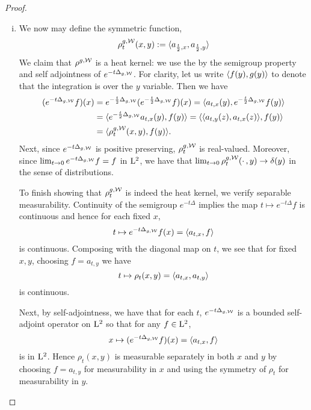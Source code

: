 \documentclass[a4paper, 12pt]{amsart}
\begin{document}
\begin{proof}
\begin{enumerate}[(i)]
\item We now may define the symmetric function,
  $$\rho^{g,\mathcal{W}}_t(x,y) := \langle a_{\frac{t}{2}, x}, a_{\frac{t}{2}, y} \rangle$$
        We claim that \(\rho^{g,\mathcal{W}}\) is a heat kernel: we use the by the semigroup property and self adjointness of \(e^{-t\Delta_{g,\mathcal{W}}}\). For clarity, let us write \(\langle f(y), g(y) \rangle\) to denote that the integration is over the \(y\) variable. Then we have
	\[
        \begin{split}
        (e^{-t \Delta_{g,\mathcal{W}}}f) (x) &= e^{-\frac{t}{2} \Delta_{g,\mathcal{W}}} (e^{-\frac{t}{2} \Delta_{g,\mathcal{W}}} f) (x) = \langle a_{t,x} (y), e^{-\frac{t}{2} \Delta_{g,\mathcal{W}}} f (y) \rangle \\
        &= \langle e^{-\frac{t}{2} \Delta_{g,\mathcal{W}}} a_{t,x} (y), f (y) \rangle = \langle \langle a_{t,y}(z), a_{t,x}(z) \rangle, f(y) \rangle \\
        &= \langle \rho^{g,\mathcal{W}}_t(x,y), f(y) \rangle.
        \end{split}
        \]
        Next, since $e^{-t \Delta_{g,\mathcal{W}}}$	is positive preserving, $\rho_t^{g,\mathcal{W}}$ is real-valued. Moreover, since $\lim_{t\to 0} e^{-t\Delta_{g,\mathcal{W}}}f = f$ in ${\rm L}^{2}_{\rm {}}$, we have that $\lim_{t \to 0} \rho^{g,\mathcal{W}}_t(\cdotp,y) \to  \delta(y)$ in the sense of distributions.

        To finish showing that $\rho^{g,\mathcal{W}}_t$ is indeed the heat kernel, we verify separable measurability. Continuity of the semigroup \(e^{-t\Delta}\) implies the map \(t \mapsto e^{-t \Delta} f\) is continuous and hence for each fixed \(x\),
        \[
        t \mapsto e^{-t\Delta_{g,\mathcal{W}}} f (x) = \langle a_{t,x}, f \rangle
        \]
        is continuous. Composing with the diagonal map on \(t\), we see that for fixed \(x,y\), choosing \(f = a_{t,y}\) we have
        \[
        t \mapsto \rho_t(x, y) = \langle a_{t,x}, a_{t,y} \rangle
        \]
        is continuous.

        Next, by self-adjointness, we have that for each \(t\), $e^{-t \Delta_{g,\mathcal{W}}}$
	is a bounded self-adjoint operator on \({\rm L}^{2}_{\rm {}}\) so that for any \(f \in {\rm L}^{2}_{\rm {}}\),
        \[
        x \mapsto (e^{-t \Delta_{g,\mathcal{W}}} f) (x) = \langle a_{t,x}, f \rangle
        \]
        is in \({\rm L}^{2}_{\rm {}}\). Hence \(\rho_t(x, y)\) is measurable separately in both \(x\) and \(y\) by choosing \(f = a_{t,y}\) for measurability in \(x\) and using the symmetry of \(\rho_t\) for measurability in \(y\).


\end{enumerate}
\end{proof}
\end{document}
